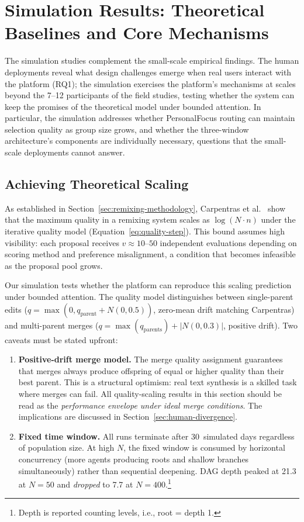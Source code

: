 \documentclass[a4paper, 12pt, twoside]{iviathesis}
\begin{document}
\section{Simulation Results: Theoretical Baselines and Core Mechanisms}
\label{sec:sim-design-contract}

The simulation studies complement the small-scale empirical findings. The human deployments reveal what design challenges emerge when real users interact with the platform (RQ1); the simulation exercises the platform's mechanisms at scales beyond the 7--12 participants of the field studies, testing whether the system can keep the promises of the theoretical model under bounded attention. In particular, the simulation addresses whether PersonalFocus routing can maintain selection quality as group size grows, and whether the three-window architecture's components are individually necessary, questions that the small-scale deployments cannot answer.

\subsection{Achieving Theoretical Scaling}
\label{sec:routing-triumph}

As established in Section~\ref{sec:remixing-methodology}, Carpentras et al.~\cite{carpentras_wisdom_2025} show that the maximum quality in a remixing system scales as $\log(N \cdot n)$ under the iterative quality model (Equation~\ref{eq:quality-step}). This bound assumes high visibility: each proposal receives $v \approx 10$--$50$ independent evaluations depending on scoring method and preference misalignment, a condition that becomes infeasible as the proposal pool grows.

Our simulation tests whether the platform can reproduce this scaling prediction under bounded attention. The quality model distinguishes between single-parent edits ($q = \max(0, q_{\text{parent}} + N(0, 0.5))$, zero-mean drift matching Carpentras) and multi-parent merges ($q = \max(q_{\text{parents}}) + |N(0, 0.3)|$, positive drift). Two caveats must be stated upfront:

\begin{enumerate}
  \item \textbf{Positive-drift merge model.} The merge quality assignment guarantees that merges always produce offspring of equal or higher quality than their best parent. This is a structural optimism: real text synthesis is a skilled task where merges can fail. All quality-scaling results in this section should be read as the \textit{performance envelope under ideal merge conditions}. The implications are discussed in Section~\ref{sec:human-divergence}.
  \item \textbf{Fixed time window.} All runs terminate after 30~simulated days regardless of population size. At high $N$, the fixed window is consumed by horizontal concurrency (more agents producing roots and shallow branches simultaneously) rather than sequential deepening. DAG depth peaked at 21.3 at $N=50$ and \textit{dropped} to 7.7 at $N=400$.\footnote{Depth is reported counting levels, i.e., root = depth 1.}
\end{enumerate}
\end{document}
